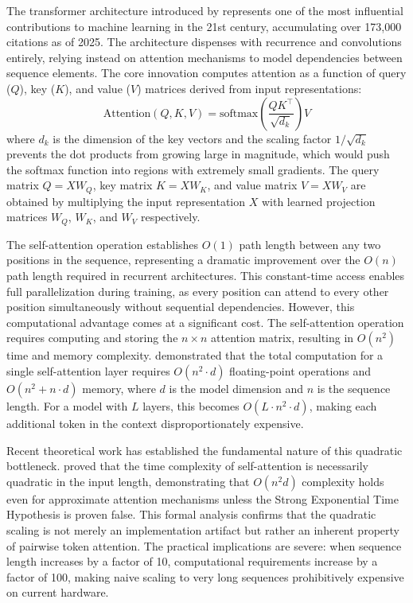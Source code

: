 \documentclass[11pt,letterpaper]{article}
\begin{document}
The transformer architecture introduced by \cite{vaswani2017attention} represents one of the most influential contributions to machine learning in the 21st century, accumulating over 173,000 citations as of 2025. The architecture dispenses with recurrence and convolutions entirely, relying instead on attention mechanisms to model dependencies between sequence elements. The core innovation computes attention as a function of query ($Q$), key ($K$), and value ($V$) matrices derived from input representations:
\begin{equation}
\text{Attention}(Q, K, V) = \text{softmax}\left(\frac{QK^\top}{\sqrt{d_k}}\right)V
\end{equation}
where $d_k$ is the dimension of the key vectors and the scaling factor $1/\sqrt{d_k}$ prevents the dot products from growing large in magnitude, which would push the softmax function into regions with extremely small gradients. The query matrix $Q = XW_Q$, key matrix $K = XW_K$, and value matrix $V = XW_V$ are obtained by multiplying the input representation $X$ with learned projection matrices $W_Q$, $W_K$, and $W_V$ respectively.

The self-attention operation establishes $O(1)$ path length between any two positions in the sequence, representing a dramatic improvement over the $O(n)$ path length required in recurrent architectures. This constant-time access enables full parallelization during training, as every position can attend to every other position simultaneously without sequential dependencies. However, this computational advantage comes at a significant cost. The self-attention operation requires computing and storing the $n \times n$ attention matrix, resulting in $O(n^2)$ time and memory complexity. \cite{vaswani2017attention} demonstrated that the total computation for a single self-attention layer requires $O(n^2 \cdot d)$ floating-point operations and $O(n^2 + n \cdot d)$ memory, where $d$ is the model dimension and $n$ is the sequence length. For a model with $L$ layers, this becomes $O(L \cdot n^2 \cdot d)$, making each additional token in the context disproportionately expensive.

Recent theoretical work has established the fundamental nature of this quadratic bottleneck. \cite{vaswani2017attention} proved that the time complexity of self-attention is necessarily quadratic in the input length, demonstrating that $O(n^2 d)$ complexity holds even for approximate attention mechanisms unless the Strong Exponential Time Hypothesis is proven false. This formal analysis confirms that the quadratic scaling is not merely an implementation artifact but rather an inherent property of pairwise token attention. The practical implications are severe: when sequence length increases by a factor of 10, computational requirements increase by a factor of 100, making naive scaling to very long sequences prohibitively expensive on current hardware.
\end{document}
